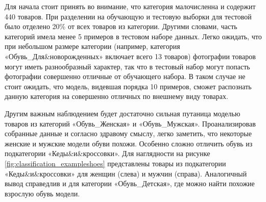 \documentclass[a4paper,12pt]{extarticle}
\begin{document}
Для начала стоит принять во внимание, что категория малочисленна и содержит 440 товаров. При разделении на обучающую и тестовую выборки для тестовой было отделено 20\% от всех товаров из категории. Другими словами, часть категорий имела менее 5 примеров в тестовом наборе данных. Легко ожидать, что при небольшом размере категории (например, категория «Обувь\_Для\&новорожденных» включает всего 13 товаров) фотографии товаров могут иметь разнообразный характер, так что в тестовый набор могут попасть фотографии совершенно отличные от обучающего набора. В таком случае не стоит ожидать, что модель, видевшая порядка 10 примеров, сможет распознать данную категория на совершенно отличных по внешнему виду товарах.

Другим важным наблюдением будет достаточно сильная путаница моделью товаров из категорий «Обувь\_Женская» и «Обувь\_Мужская». Проанализировав собранные данные и согласно здравому смыслу, легко заметить, что некоторые женские и мужские модели обуви похожи. Особенно сложно отличить обувь из подкатегории «Кеды\&и\&кроссовки». Для наглядности на рисунке \ref{fig:classification_exampleshoes} представлены товары из подкатегории «Кеды\&и\&кроссовки» для женщин (слева) и мужчин (справа). Аналогичный вывод справедлив и для категории «Обувь\_Детская», где можно найти похожие взрослую обувь модели.
\end{document}
